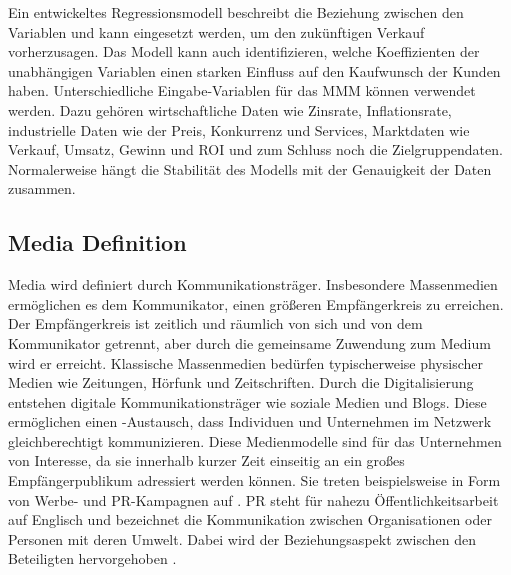 Ein entwickeltes Regressionsmodell beschreibt die Beziehung zwischen den Variablen und kann eingesetzt werden, um den zukünftigen Verkauf vorherzusagen. Das Modell kann auch identifizieren, welche Koeffizienten der unabhängigen Variablen einen starken Einfluss auf den Kaufwunsch der Kunden haben. Unterschiedliche Eingabe-Variablen für das \ac{MMM} können verwendet werden. Dazu gehören wirtschaftliche Daten wie Zinsrate, Inflationsrate, industrielle Daten wie der Preis, Konkurrenz und Services, Marktdaten wie Verkauf, Umsatz, Gewinn und \ac{ROI} und zum Schluss noch die Zielgruppendaten. Normalerweise hängt die Stabilität des Modells mit der Genauigkeit der Daten zusammen. 

\subsection{Media Definition}
\label{Media-KanäleDefinition}
Media wird definiert durch Kommunikationsträger. Insbesondere Massenmedien ermöglichen es dem Kommunikator, einen größeren Empfängerkreis zu erreichen. Der Empfängerkreis ist zeitlich und räumlich von sich und von dem Kommunikator getrennt, aber durch die gemeinsame Zuwendung zum Medium wird er erreicht. Klassische Massenmedien bedürfen typischerweise physischer Medien wie Zeitungen, Hörfunk und Zeitschriften. Durch die Digitalisierung entstehen digitale Kommunikationsträger wie soziale Medien und Blogs. Diese ermöglichen einen -Austausch, dass Individuen und Unternehmen im Netzwerk gleichberechtigt kommunizieren. Diese Medienmodelle sind für das Unternehmen von Interesse, da sie innerhalb kurzer Zeit einseitig an ein großes Empfängerpublikum adressiert werden können. Sie treten beispielsweise in Form von Werbe- und \ac{PR}-Kampagnen auf \cite{Kleinjohann2024}. \ac{PR} steht für nahezu Öffentlichkeitsarbeit auf Englisch und bezeichnet die Kommunikation zwischen Organisationen oder Personen mit deren Umwelt. Dabei wird der Beziehungsaspekt zwischen den Beteiligten hervorgehoben \cite{Büsching2014}. \\\\
